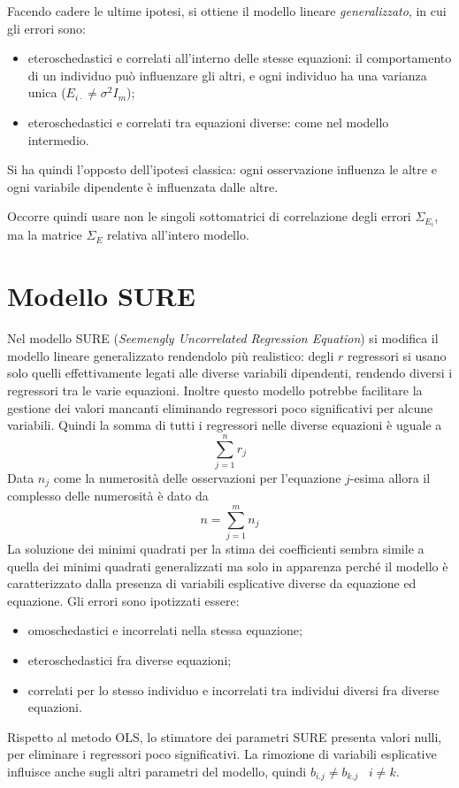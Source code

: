 \documentclass[a4page, 11pt]{article} %
\begin{document}
Facendo cadere le ultime ipotesi, si ottiene il modello lineare \textit{generalizzato}, in cui gli errori sono:
\begin{itemize}[noitemsep]
\item eteroschedastici e correlati all'interno delle stesse equazioni: il comportamento di un individuo può influenzare gli altri, e ogni individuo ha una varianza unica ($E_{i \cdot} \ne \sigma^2 I_m$);
  \item eteroschedastici e correlati tra equazioni diverse: come nel modello intermedio.
\end{itemize}
Si ha quindi l'opposto dell'ipotesi classica: ogni osservazione influenza le altre e ogni variabile dipendente è influenzata dalle altre.

Occorre quindi usare non le singoli sottomatrici di correlazione degli errori $\Sigma_{E_i}$, ma la matrice $\Sigma_E$ relativa all’intero modello.

\section{Modello SURE}

Nel modello SURE (\textit{Seemengly Uncorrelated Regression Equation}) si modifica il modello lineare generalizzato rendendolo più realistico: degli $r$ regressori si usano solo quelli effettivamente legati alle diverse variabili dipendenti, rendendo diversi i regressori tra le varie equazioni.
Inoltre questo modello potrebbe facilitare la gestione dei valori mancanti eliminando regressori poco significativi per alcune variabili.
Quindi la somma di tutti i regressori nelle diverse equazioni è uguale a
\begin{equation*}
\sum_{j=1}^n r_j
\end{equation*}
Data $n_j$ come la numerosità delle osservazioni per l’equazione $j$-esima allora il complesso delle numerosità è dato da 
\begin{equation*}
n = \sum_{j=1}^m n_j
\end{equation*}
La soluzione dei minimi quadrati per la stima dei coefficienti sembra simile a quella dei minimi quadrati generalizzati ma solo in apparenza perché il modello è caratterizzato dalla presenza di variabili esplicative diverse da equazione ed equazione.
Gli errori sono ipotizzati essere:
\begin{itemize}[noitemsep]
\item omoschedastici e incorrelati nella stessa equazione;
\item eteroschedastici fra diverse equazioni;
\item correlati per lo stesso individuo e incorrelati tra individui diversi fra diverse equazioni.
\end{itemize}
Rispetto al metodo OLS, lo stimatore dei parametri SURE presenta valori nulli, per eliminare i regressori poco significativi.
La rimozione di variabili esplicative influisce anche sugli altri parametri del modello, quindi $b_{i.j} \ne b_{k.j} \hspace{10pt} i \ne k$.
\end{document}
